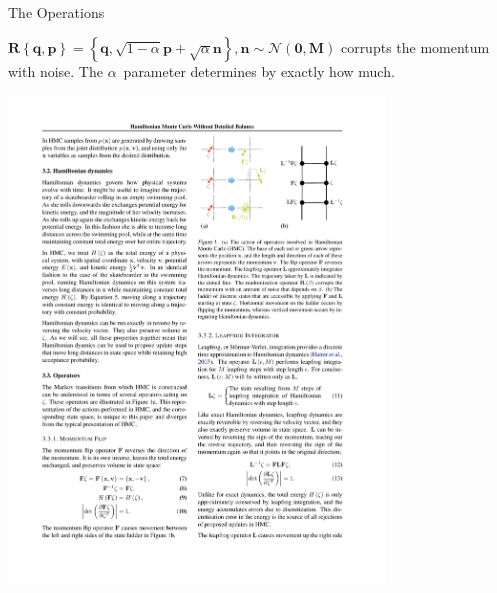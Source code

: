 \documentclass{beamer}
\renewcommand{\vec}[1]{\ensuremath{\mathbf{#1}}}
\newcommand{\mat}[1]{\ensuremath{\mathbf{#1}}}
\newcommand{\op}[1]{\ensuremath{\mathbf{#1}}}
\newcommand{\norm}{\ensuremath{\mathcal{N}}}
\begin{document}
    \begin{frame}{The Operations}

        \begin{definition}
            $\op{R}\left\{\vec{q},\vec{p}\right\} = \left\{\vec{q}, \sqrt{1-\alpha}\vec{p} + \sqrt{\alpha}\vec{n}\right\}, \vec{n} \sim \norm\left(\vec{0}, \mat{M}\right)$ corrupts the momentum with noise. The $\alpha$~parameter determines by exactly how much.
        \end{definition}

        \vfill

        \centering
        \includegraphics[width=0.75\textwidth]{R.pdf}

    \end{frame}
\end{document}
